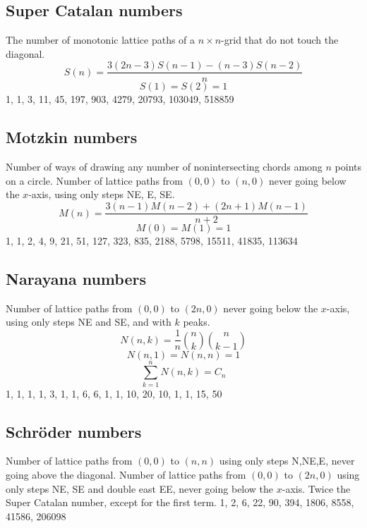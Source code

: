 {\subsection{Super Catalan numbers}
	The number of monotonic lattice paths of a $n\times n$-grid that do not touch the diagonal.
	$$S(n) = \frac{3(2n-3)S(n-1)-(n-3)S(n-2)}{n}$$
	$$S(1)=S(2)=1$$
	1, 1, 3, 11, 45, 197, 903, 4279, 20793, 103049, 518859

\subsection{Motzkin numbers}
	Number of ways of drawing any number of nonintersecting chords among $n$ points on a circle. Number of lattice paths from $(0,0)$ to $(n,0)$ never going below the $x$-axis, using only steps NE, E, SE.
	$$M(n) = \frac{3(n-1)M(n-2)+(2n+1)M(n-1)}{n+2}$$
	$$M(0) = M(1) = 1$$
	1, 1, 2, 4, 9, 21, 51, 127, 323, 835, 2188, 5798, 15511, 41835, 113634

\subsection{Narayana numbers}
	Number of lattice paths from $(0,0)$ to $(2n,0)$ never going below the $x$-axis, using only steps NE and SE, and with $k$ peaks.
	$$N(n,k) = \frac{1}{n}\binom{n}{k}\binom{n}{k-1}$$
	$$N(n,1) = N(n,n) = 1$$
	$$\sum_{k=1}^n N(n,k) = C_n$$
	1, 1, 1, 1, 3, 1, 1, 6, 6, 1, 1, 10, 20, 10, 1, 1, 15, 50

\subsection{Schr\" oder numbers}
	Number of lattice paths from $(0,0)$ to $(n,n)$ using only steps N,NE,E, never going above the diagonal. Number of lattice paths from $(0,0)$ to $(2n,0)$ using only steps NE, SE and double east EE, never going below the $x$-axis. Twice the Super Catalan number, except for the first term.
	1, 2, 6, 22, 90, 394, 1806, 8558, 41586, 206098

}
